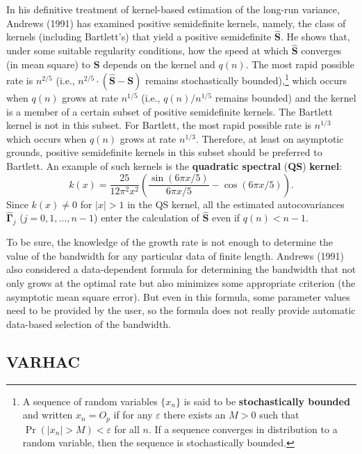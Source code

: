 In his definitive treatment of kernel-based estimation of the long-run variance,
Andrews (1991) has examined positive semidefinite kernels, namely, the class of
kernels (including Bartlett's) that yield a positive semidefinite $\hat{\mathbf{S}}$. He shows that,
under some suitable regularity conditions, how the speed at which $\hat{\mathbf{S}}$ converges (in mean
square) to $\mathbf{S}$ depends on the kernel and $q(n)$. The most rapid possible rate is $n^{2/5}$
(i.e., $n^{2/5} \cdot (\hat{\mathbf{S}} - \mathbf{S})$ remains stochastically bounded),\footnote{A sequence of random variables $\{x_n\}$ is said to be \textbf{stochastically bounded} and written $x_n = O_p$ if for any $\varepsilon$ there exists an $M > 0$ such that $\Pr(|x_n| > M) < \varepsilon$ for all $n$. If a sequence converges in distribution to a random variable, then the sequence is stochastically bounded.}
which occurs when $q(n)$
grows at rate $n^{1/5}$ (i.e., $q(n)/n^{1/5}$ remains bounded) and the kernel is a member of
a certain subset of positive semidefinite kernels. The Bartlett kernel is not in this
subset. For Bartlett, the most rapid possible rate is $n^{1/3}$ which occurs when $q(n)$
grows at rate $n^{1/3}$. Therefore, at least on asymptotic grounds, positive semidefinite
kernels in this subset should be preferred to Bartlett. An example of such kernels
is the \textbf{quadratic spectral} (\textbf{QS}) \textbf{kernel}:
\begin{equation}
  k(x) = \frac{25}{12\pi^2 x^2}
  \left(\frac{\sin(6\pi x/5)}{6\pi x/5} - \cos(6\pi x/5)\right).
  \label{eq:6.6.9}
\end{equation}
Since $k(x) \neq 0$ for $|x| > 1$ in the QS kernel, all the estimated autocovariances $\hat{\bm{\Gamma}}_j$
($j = 0, 1, \ldots, n-1$) enter the calculation of $\hat{\mathbf{S}}$ even if $q(n) < n - 1$.

To be sure, the knowledge of the growth rate is not enough to determine the
value of the bandwidth for any particular data of finite length. Andrews (1991)
also considered a data-dependent formula for determining the bandwidth that not
only grows at the optimal rate but also minimizes some appropriate criterion (the
asymptotic mean square error). But even in this formula, some parameter values
need to be provided by the user, so the formula does not really provide automatic
data-based selection of the bandwidth.

\subsection*{VARHAC}

